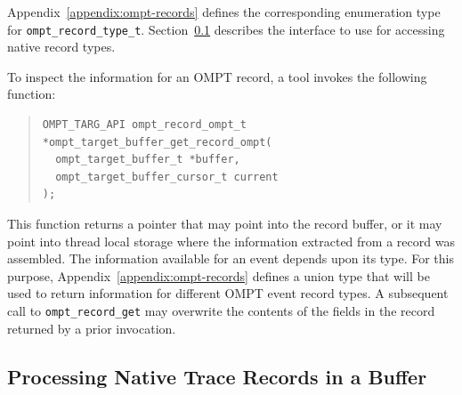 \documentclass{article}
\begin{document}
Appendix~\ref{appendix:ompt-records} defines the corresponding enumeration type for \verb|ompt_record_type_t|. 
Section~\ref{sec:native-record-data} describes the interface to use for accessing native record types.
 

To inspect the information for an OMPT record, a tool invokes the following function:
\begin{quote}
\begin{verbatim}
OMPT_TARG_API ompt_record_ompt_t *ompt_target_buffer_get_record_ompt(
  ompt_target_buffer_t *buffer, 
  ompt_target_buffer_cursor_t current
);
\end{verbatim}
\end{quote}
This function returns a pointer that may point into the record buffer, or it may point into thread local storage where the information extracted from a record was assembled. The information available for an event depends upon its type. For this purpose, Appendix~\ref{appendix:ompt-records} defines a union type that will be used to return information for different OMPT event record types. A subsequent call to \verb|ompt_record_get| may overwrite the contents of the fields in the record returned by a prior invocation.

\subsection{Processing Native Trace Records in a Buffer}
\label{sec:native-record-data}
\end{document}
